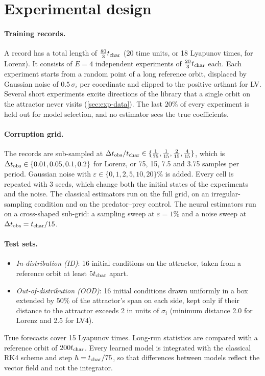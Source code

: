 \section{Experimental design}\label{sec:design}

\paragraph{Training records.} A record has a total length of $\tfrac{80}{3}t_{\mathrm{char}}$ (20 time units, or 18 Lyapunov times, for Lorenz). It consists of $E=4$ independent experiments of $\tfrac{20}{3}t_{\mathrm{char}}$ each. Each experiment starts from a random point of a long reference orbit, displaced by Gaussian noise of $0.5\,\sigma_i$ per coordinate and clipped to the positive orthant for LV. Several short experiments excite directions of the library that a single orbit on the attractor never visits (\cref{sec:exp-data}). The last $20\%$ of every experiment is held out for model selection, and no estimator sees the true coefficients.

\paragraph{Corruption grid.} The records are sub-sampled at $\Delta t_{\mathrm{obs}}/t_{\mathrm{char}}\in\{\tfrac1{75},\tfrac1{15},\tfrac2{15},\tfrac4{15}\}$, which is $\Delta t_{\mathrm{obs}}\in\{0.01,0.05,0.1,0.2\}$ for Lorenz, or 75, 15, 7.5 and 3.75 samples per period. Gaussian noise with $\varepsilon\in\{0,1,2,5,10,20\}\%$ is added. Every cell is repeated with 3 seeds, which change both the initial states of the experiments and the noise. The classical estimators run on the full grid, on an irregular-sampling condition and on the predator--prey control. The neural estimators run on a cross-shaped sub-grid: a sampling sweep at $\varepsilon=1\%$ and a noise sweep at $\Delta t_{\mathrm{obs}}=t_{\mathrm{char}}/15$.

\paragraph{Test sets.}
\begin{itemize}
  \item \emph{In-distribution (ID)}: 16 initial conditions on the attractor, taken from a reference orbit at least $5t_{\mathrm{char}}$ apart.
  \item \emph{Out-of-distribution (OOD)}: 16 initial conditions drawn uniformly in a box extended by $50\%$ of the attractor's span on each side, kept only if their distance to the attractor exceeds 2 in units of $\sigma_i$ (minimum distance 2.0 for Lorenz and 2.5 for LV4).
\end{itemize}
True forecasts cover 15 Lyapunov times. Long-run statistics are compared with a reference orbit of $200t_{\mathrm{char}}$. Every learned model is integrated with the classical RK4 scheme and step $h=t_{\mathrm{char}}/75$, so that differences between models reflect the vector field and not the integrator.

